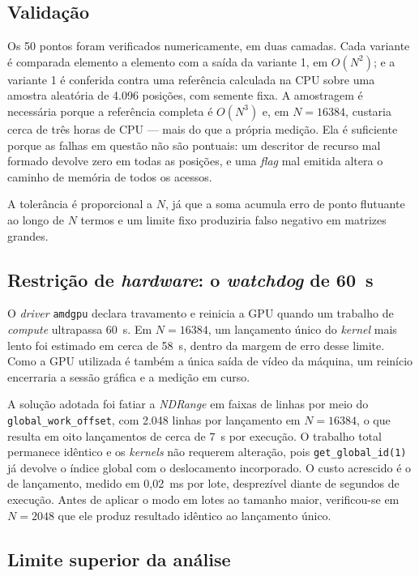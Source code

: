 \documentclass[12pt]{article}
\begin{document}
\subsection{Validação}

Os 50 pontos foram verificados numericamente, em duas camadas. Cada variante é
comparada elemento a elemento com a saída da variante 1, em $O(N^2)$; e a
variante 1 é conferida contra uma referência calculada na CPU sobre uma amostra
aleatória de 4.096 posições, com semente fixa. A amostragem é necessária porque
a referência completa é $O(N^3)$ e, em $N=16384$, custaria cerca de três horas
de CPU --- mais do que a própria medição. Ela é suficiente porque as falhas em
questão não são pontuais: um descritor de recurso mal formado devolve zero em
todas as posições, e uma \textit{flag} mal emitida altera o caminho de memória
de todos os acessos.

A tolerância é proporcional a $N$, já que a soma acumula erro de ponto flutuante
ao longo de $N$ termos e um limite fixo produziria falso negativo em matrizes
grandes.

\subsection{Restrição de \textit{hardware}: o \textit{watchdog} de 60~s}

O \textit{driver} \texttt{amdgpu} declara travamento e reinicia a GPU quando um
trabalho de \textit{compute} ultrapassa 60~s. Em $N=16384$, um lançamento único
do \textit{kernel} mais lento foi estimado em cerca de 58~s, dentro da margem de
erro desse limite. Como a GPU utilizada é também a única saída de vídeo da
máquina, um reinício encerraria a sessão gráfica e a medição em curso.

A solução adotada foi fatiar a \textit{NDRange} em faixas de linhas por meio do
\texttt{global\_work\_offset}, com 2.048 linhas por lançamento em $N=16384$, o
que resulta em oito lançamentos de cerca de 7~s por execução. O trabalho total
permanece idêntico e os \textit{kernels} não requerem alteração, pois
\texttt{get\_global\_id(1)} já devolve o índice global com o deslocamento
incorporado. O custo acrescido é o de lançamento, medido em 0,02~ms por lote,
desprezível diante de segundos de execução. Antes de aplicar o modo em lotes ao
tamanho maior, verificou-se em $N=2048$ que ele produz resultado idêntico ao
lançamento único.

\subsection{Limite superior da análise}
\end{document}
